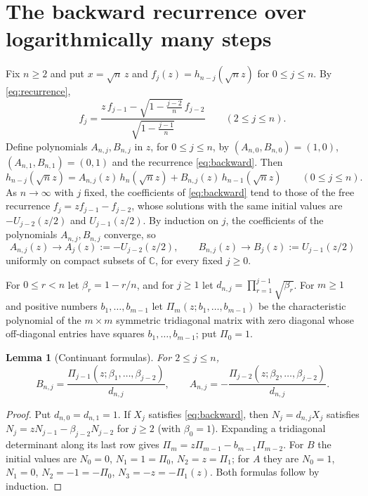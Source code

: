 \documentclass[11pt]{amsart}
\newtheorem{lemma}[theorem]{Lemma}
\theoremstyle{definition}
\theoremstyle{remark}
\numberwithin{equation}{section}
\newcommand{\C}{\mathbb{C}}
\begin{document}
\section{The backward recurrence over logarithmically many steps}\label{sec:transfer}

Fix $n\ge2$ and put $x=\sqrt n\,z$ and $f_j(z)=h_{n-j}(\sqrt nz)$ for $0\le j\le n$. By \eqref{eq:recurrence},
\begin{equation}\label{eq:backward}
f_j=\frac{z\,f_{j-1}-\sqrt{1-\frac{j-2}{n}}\,f_{j-2}}{\sqrt{1-\frac{j-1}n}}\qquad(2\le j\le n).
\end{equation}
Define polynomials $A_{n,j},B_{n,j}$ in $z$, for $0\le j\le n$, by $(A_{n,0},B_{n,0})=(1,0)$, $(A_{n,1},B_{n,1})=(0,1)$ and the recurrence \eqref{eq:backward}. Then
\begin{equation}\label{eq:AB}
h_{n-j}(\sqrt nz)=A_{n,j}(z)\,h_n(\sqrt nz)+B_{n,j}(z)\,h_{n-1}(\sqrt nz)\qquad(0\le j\le n).
\end{equation}
As $n\to\infty$ with $j$ fixed, the coefficients of \eqref{eq:backward} tend to those of the free recurrence $f_j=zf_{j-1}-f_{j-2}$, whose solutions with the same initial values are $-U_{j-2}(z/2)$ and $U_{j-1}(z/2)$. By induction on $j$, the coefficients of the polynomials $A_{n,j},B_{n,j}$ converge, so
\begin{equation}\label{eq:fixed-j}
A_{n,j}(z)\to A_j(z):=-U_{j-2}(z/2),\qquad B_{n,j}(z)\to B_j(z):=U_{j-1}(z/2)
\end{equation}
uniformly on compact subsets of $\C$, for every fixed $j\ge0$.

For $0\le r<n$ let $\beta_r=1-r/n$, and for $j\ge1$ let $d_{n,j}=\prod_{r=1}^{j-1}\sqrt{\beta_r}$. For $m\ge1$ and positive numbers $b_1,\dots,b_{m-1}$ let $\Pi_m(z;b_1,\dots,b_{m-1})$ be the characteristic polynomial of the $m\times m$ symmetric tridiagonal matrix with zero diagonal whose off-diagonal entries have squares $b_1,\dots,b_{m-1}$; put $\Pi_0=1$.

\begin{lemma}[Continuant formulas]\label{lem:continuant}
For $2\le j\le n$,
\[
B_{n,j}=\frac{\Pi_{j-1}(z;\beta_1,\dots,\beta_{j-2})}{d_{n,j}},\qquad A_{n,j}=-\frac{\Pi_{j-2}(z;\beta_2,\dots,\beta_{j-2})}{d_{n,j}}.
\]
\end{lemma}

\begin{proof}
Put $d_{n,0}=d_{n,1}=1$. If $X_j$ satisfies \eqref{eq:backward}, then $N_j=d_{n,j}X_j$ satisfies $N_j=zN_{j-1}-\beta_{j-2}N_{j-2}$ for $j\ge2$ (with $\beta_0=1$). Expanding a tridiagonal determinant along its last row gives $\Pi_m=z\Pi_{m-1}-b_{m-1}\Pi_{m-2}$. For $B$ the initial values are $N_0=0$, $N_1=1=\Pi_0$, $N_2=z=\Pi_1$; for $A$ they are $N_0=1$, $N_1=0$, $N_2=-1=-\Pi_0$, $N_3=-z=-\Pi_1(z)$. Both formulas follow by induction.
\end{proof}
\end{document}
